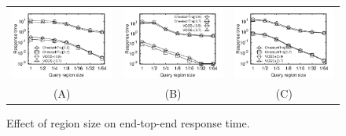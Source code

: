 \begin{figure}
	\centering
	\small
	\begin{tabular}{ccc}
		\includegraphics[width=0.3\linewidth]{pictures/quantitative_study/size_porto_t}
		&
		\includegraphics[width=0.3\linewidth]{pictures/quantitative_study/size_sz_t}
		&
		\includegraphics[width=0.3\linewidth]{pictures/quantitative_study/size_cd_t}
		\\
		(A) \pt{}
		&
		(B) \sz{}
		&
		(C) \cd{}
	\end{tabular}
    \trim
	\caption{Effect of region size on end-top-end response time.}
	\label{fig:size_responsetime}
	\trim \trim
\end{figure}


